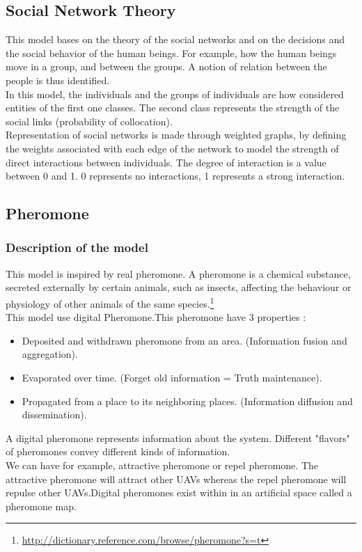\subsection{Social Network Theory}

This model bases on the theory of the social networks and on the decisions and the social behavior of the human beings. For example, how the human beings move in a group, and between the groups. A notion of relation between the people is thus identified.\\
In this model, the individuals and the groups of individuals are how considered entities of the first one classes. The second class represents the strength of the social links (probability of collocation).\\
Representation of social networks is made ​​through weighted graphs, by defining the weights associated with each edge of the network to model the strength of direct interactions between individuals. The degree of interaction is a value between 0 and 1. 0 represents no interactions, 1 represents a strong interaction.
\subsection{Pheromone}

\subsubsection{Description of the model}
This model is inspired by real pheromone. A pheromone is a chemical substance, secreted externally by certain animals, such as insects, affecting the behaviour or physiology of other animals of the same species.\footnote{\url{http://dictionary.reference.com/browse/pheromone?s=t}}
\\
This model use digital Pheromone.This pheromone have 3 properties :

\begin{itemize}
\item  Deposited and withdrawn pheromone from an area. (Information fusion and aggregation).
\item  Evaporated over time. (Forget old information = Truth maintenance).
\item  Propagated from a place to its neighboring places. (Information diffusion and dissemination). 
\end{itemize}

A  digital  pheromone  represents  information  about  the  system. Different  "flavors"  of  pheromones convey different kinds of information.\\ We can have for example, attractive pheromone or repel pheromone. The attractive pheromone will attract other UAVs whereas the repel pheromone will repulse other UAVs.Digital pheromones exist within in an artificial space called a pheromone map.

